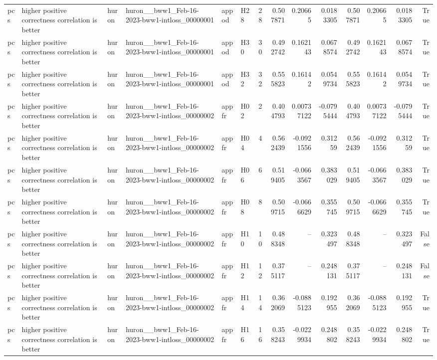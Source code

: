 \begin{longtable}{llllllrrrrrrrr}
pcs & higher positive correctness correlation is better & huron & huron\_\_bww1\_Feb-16-2023-bww1-intloss\_00000001 & appod & H28 & 28 & 0.507871 & 0.20665 & 0.0183305 & 0.507871 & 0.20665 & 0.0183305 & True \\
pcs & higher positive correctness correlation is better & huron & huron\_\_bww1\_Feb-16-2023-bww1-intloss\_00000001 & appod & H30 & 30 & 0.492742 & 0.162143 & 0.0678574 & 0.492742 & 0.162143 & 0.0678574 & True \\
pcs & higher positive correctness correlation is better & huron & huron\_\_bww1\_Feb-16-2023-bww1-intloss\_00000001 & appod & H32 & 32 & 0.555823 & 0.16142 & 0.0549734 & 0.555823 & 0.16142 & 0.0549734 & True \\
pcs & higher positive correctness correlation is better & huron & huron\_\_bww1\_Feb-16-2023-bww1-intloss\_00000002 & appfr & H02 & 2 & 0.404793 & 0.00737122 & -0.0795444 & 0.404793 & 0.00737122 & -0.0795444 & True \\
pcs & higher positive correctness correlation is better & huron & huron\_\_bww1\_Feb-16-2023-bww1-intloss\_00000002 & appfr & H04 & 4 & 0.562439 & -0.0921556 & 0.31259 & 0.562439 & -0.0921556 & 0.31259 & True \\
pcs & higher positive correctness correlation is better & huron & huron\_\_bww1\_Feb-16-2023-bww1-intloss\_00000002 & appfr & H06 & 6 & 0.519405 & -0.0663567 & 0.383029 & 0.519405 & -0.0663567 & 0.383029 & True \\
pcs & higher positive correctness correlation is better & huron & huron\_\_bww1\_Feb-16-2023-bww1-intloss\_00000002 & appfr & H08 & 8 & 0.509715 & -0.0666629 & 0.355745 & 0.509715 & -0.0666629 & 0.355745 & True \\
pcs & higher positive correctness correlation is better & huron & huron\_\_bww1\_Feb-16-2023-bww1-intloss\_00000002 & appfr & H10 & 10 & 0.488348 & -- & 0.323497 & 0.488348 & -- & 0.323497 & False \\
pcs & higher positive correctness correlation is better & huron & huron\_\_bww1\_Feb-16-2023-bww1-intloss\_00000002 & appfr & H12 & 12 & 0.375117 & -- & 0.248131 & 0.375117 & -- & 0.248131 & False \\
pcs & higher positive correctness correlation is better & huron & huron\_\_bww1\_Feb-16-2023-bww1-intloss\_00000002 & appfr & H14 & 14 & 0.362069 & -0.0885123 & 0.192955 & 0.362069 & -0.0885123 & 0.192955 & True \\
pcs & higher positive correctness correlation is better & huron & huron\_\_bww1\_Feb-16-2023-bww1-intloss\_00000002 & appfr & H16 & 16 & 0.358243 & -0.0229934 & 0.248802 & 0.358243 & -0.0229934 & 0.248802 & True \\

\end{longtable}
